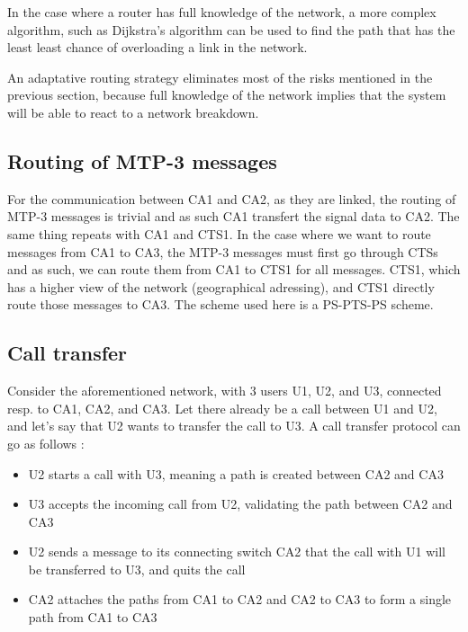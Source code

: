 \documentclass[lettersize,journal]{IEEEtran} %
\begin{document}
In the case where a router has full knowledge of the network, a more complex algorithm, such as Dijkstra's
algorithm can be used to find the path that has the least least chance of overloading a link in the network.

An adaptative routing strategy eliminates most of the risks mentioned in the previous section, because full
knowledge of the network implies that the system will be able to react to a network breakdown.

\subsection{Routing of MTP-3 messages}
For the communication between CA1 and CA2, as they are linked, the routing of MTP-3 messages is 
trivial and as such CA1 transfert the signal data to CA2. The same thing repeats with CA1 and CTS1.
In the case where we want to route messages from CA1 to CA3, the MTP-3 messages must first go through
CTSs and as such, we can route them from CA1 to CTS1 for all messages. CTS1, which has a higher view
of the network (geographical adressing), and CTS1 directly route those messages to CA3. The scheme used here is a PS-PTS-PS scheme. 

\subsection{Call transfer}
Consider the aforementioned network, with 3 users U1, U2, and U3, connected resp. to CA1, CA2, and CA3.
Let there already be a call between U1 and U2, and let's say that U2 wants to transfer the call to U3.
A call transfer protocol can go as follows : 
\begin{itemize}
        \item U2 starts a call with U3, meaning a path is created between CA2 and CA3
        \item U3 accepts the incoming call from U2, validating the path between CA2 and CA3
        \item U2 sends a message to its connecting switch CA2 that the call with U1 will be transferred to U3, and quits the call
        \item CA2 attaches the paths from CA1 to CA2 and CA2 to CA3 to form a single path from CA1 to CA3
\end{itemize}
\end{document}
